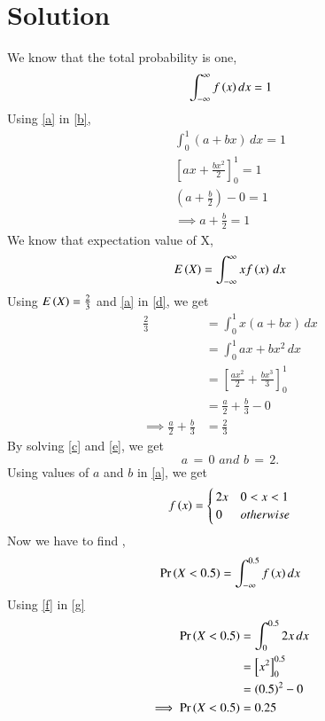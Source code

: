 \documentclass[journal,12pt,twocolumn]{IEEEtran}
\begin{document}
\section{Solution}
We know that the total probability is one,
\begin{equation}
    \int_{-\infty}^{\infty}{f\left(x\right) dx} = 1\label{b}
\end{equation}
Using \eqref{a} in \eqref{b},
\begin{align}
    \int_{0}^{1}{(a+bx)\,dx} = 1\\
    \left[ax+\frac{bx^2}{2}\right]_0^1=1\\
    \left(a+\frac{b}{2}\right)-0=1\\
    \implies a+\frac{b}{2}=1 \label{c}
\end{align}
We know that expectation value of X,
\begin{align}
    E\left(X\right)=\int_{-\infty}^{\infty}xf\left(x\right)\,dx\label{d}
\end{align}
\newpage
Using $E\left(X\right)=\frac{2}{3}$ and \eqref{a} in \eqref{d}, we get
\begin{align}
     \frac{2}{3}&=\int_{0}^{1}x(a+bx)\,dx\\
     &=\int_{0}^{1} ax+bx^2\,dx\\
     &= \left[\frac{ax^2}{2}+\frac{bx^3}{3}\right]_0^1\\
     &= \frac{a}{2}+\frac{b}{3}-0\\
     \implies\frac{a}{2}+\frac{b}{3}&=\frac{2}{3}\label{e}
\end{align}
By solving \eqref{c} and \eqref{e}, we get \\
$$a\, =\, 0 \,\,and\,\, b\, =\, 2.$$
Using values of $a$ and $b$ in \eqref{a}, we get
\begin{align}
f\left(x\right)
= 
\begin{cases}
2x & 0<x<1
\\
0 & otherwise
\end{cases}\label{f}\\
\end{align}
Now we have to find ,
\begin{align}
\Pr\left(X<0.5\right) = \int_{-\infty}^{0.5}{f\left(x\right)}\,dx\label{g}
\end{align}
Using \eqref{f} in \eqref{g}
\begin{align}
    \Pr\left(X<0.5\right) &= \int_{0}^{0.5}{2x}\,dx\\
    &= \left[x^2\right]_0^{0.5}\\
    &= (0.5)^2-0\\
  \implies  \Pr\left(X<0.5\right) &= 0.25
\end{align}
\end{document}
